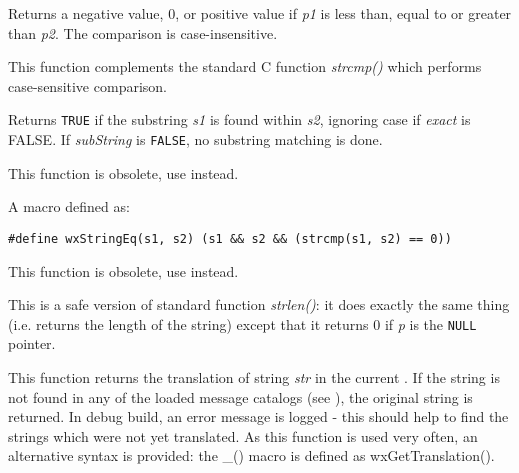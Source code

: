 Returns a negative value, 0, or positive value if {\it p1} is less than, equal
to or greater than {\it p2}. The comparison is case-insensitive.

This function complements the standard C function {\it strcmp()} which performs
case-sensitive comparison.



Returns {\tt TRUE} if the substring {\it s1} is found within {\it s2},
ignoring case if {\it exact} is FALSE. If {\it subString} is {\tt FALSE},
no substring matching is done.

This function is obsolete, use  instead.

\label{wxstringeq}


A macro defined as:

\begin{verbatim}
#define wxStringEq(s1, s2) (s1 && s2 && (strcmp(s1, s2) == 0))
\end{verbatim}

This function is obsolete, use  instead.

\label{wxstrlen}


This is a safe version of standard function {\it strlen()}: it does exactly the
same thing (i.e. returns the length of the string) except that it returns 0 if
{\it p} is the {\tt NULL} pointer.

\label{wxgettranslation}


This function returns the translation of string {\it str} in the current
. If the string is not found in any of the loaded
message catalogs (see ), the
original string is returned. In debug build, an error message is logged - this
should help to find the strings which were not yet translated. As this function
is used very often, an alternative syntax is provided: the \_() macro is
defined as wxGetTranslation().


